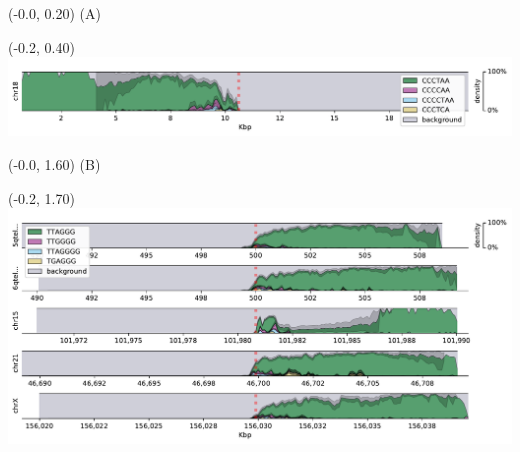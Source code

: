 \documentclass{article}
\begin{document}
\begin{textblock}{13}(-0.0,  0.20) \LARGE{(A)} \end{textblock}
\begin{textblock}{13}(-0.2,  0.40) \includegraphics[width=.6\textwidth,keepaspectratio]{densityplots/HG001-densityplot-p_arm.pdf}   \end{textblock}

\begin{textblock}{13}(-0.0,  1.60) \LARGE{(B)} \end{textblock}
\begin{textblock}{13}(-0.2,  1.70) \includegraphics{densityplots/HG001-densityplot-q_arm.pdf}   \end{textblock}
\end{document}
